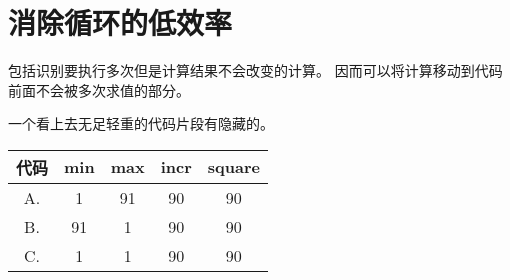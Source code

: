 
\section{消除循环的低效率}
{
    包括识别要执行多次但是计算结果不会改变的计算。
    因而可以将计算移动到代码前面不会被多次求值的部分。

    一个看上去无足轻重的代码片段有隐藏的。

    \begin{practicec}
        \begin{table}[htb]
            \begin{tabular}{|c|c|c|c|c|}
                \hline
                代码 & min & max & incr & square \\
                \hline
                A. & 1 & 91 & 90 & 90 \\
                \hline
                B. & 91 & 1 & 90 & 90 \\
                \hline
                C. & 1 & 1 & 90 & 90 \\
                \hline
            \end{tabular}
        \end{table}
    \end{practicec}
}
